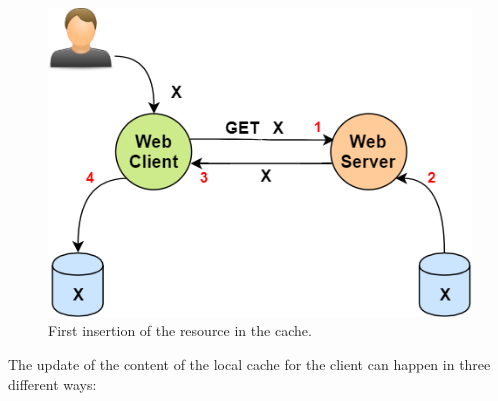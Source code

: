 \begin{figure}[h]
\centering
\includegraphics[scale=0.5]{Images/HTTP/caching}
\caption{\footnotesize{First insertion of the resource in the cache.\\}}\label{catching}
\end{figure}
The update of the content of the local cache for the client can happen in three different ways:
